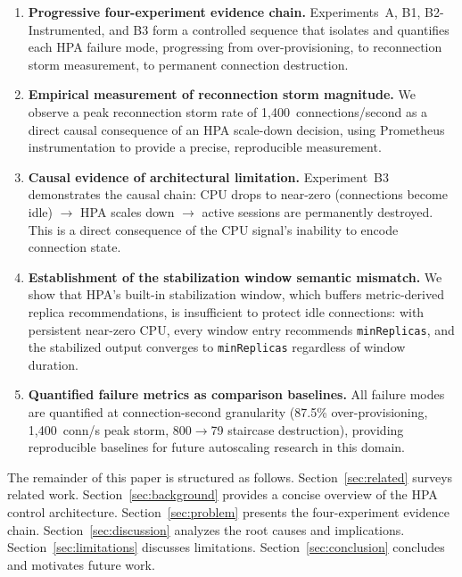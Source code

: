 \documentclass[twocolumn]{svjour3}
\begin{document}
\begin{enumerate}[leftmargin=*]
\item \textbf{Progressive four-experiment evidence chain.} Experiments~A, B1,
  B2-Instrumented, and B3 form a controlled sequence that isolates and quantifies
  each HPA failure mode, progressing from over-provisioning, to reconnection storm
  measurement, to permanent connection destruction.

\item \textbf{Empirical measurement of reconnection storm magnitude.} We observe
  a peak reconnection storm rate of 1,400~connections/second as a direct causal consequence
  of an HPA scale-down decision, using Prometheus instrumentation to provide a precise,
  reproducible measurement.

\item \textbf{Causal evidence of architectural limitation.} Experiment~B3 demonstrates the
  causal chain: CPU drops to near-zero (connections become idle) $\rightarrow$ HPA scales
  down $\rightarrow$ active sessions are permanently destroyed. This is a direct consequence
  of the CPU signal's inability to encode connection state.

\item \textbf{Establishment of the stabilization window semantic mismatch.} We show that
  HPA's built-in stabilization window, which buffers metric-derived replica recommendations,
  is insufficient to protect idle connections: with persistent near-zero CPU, every window
  entry recommends \texttt{minReplicas}, and the stabilized output converges to
  \texttt{minReplicas} regardless of window duration.

\item \textbf{Quantified failure metrics as comparison baselines.} All failure modes are
  quantified at connection-second granularity (87.5\% over-provisioning, 1,400~conn/s peak
  storm, 800$\rightarrow$79 staircase destruction), providing reproducible baselines for
  future autoscaling research in this domain.
\end{enumerate}

The remainder of this paper is structured as follows. Section~\ref{sec:related} surveys
related work. Section~\ref{sec:background} provides a concise overview of the HPA control
architecture. Section~\ref{sec:problem} presents the four-experiment evidence chain.
Section~\ref{sec:discussion} analyzes the root causes and implications.
Section~\ref{sec:limitations} discusses limitations. Section~\ref{sec:conclusion} concludes
and motivates future work.
\end{document}
